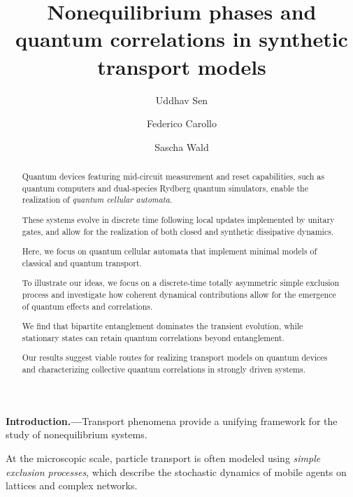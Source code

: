 \documentclass[aps,prl,twocolumn,groupedaddress,superscriptaddress,colorlinks,bookmarks=false,citecolor=darkspringgreen,linkcolor=darkolivegreen,urlcolor=navyblue]{revtex4-1}
\newcommand{\papertitle}{
Nonequilibrium phases and quantum correlations in
synthetic transport models
}
\begin{document}
\title{\papertitle}


\author{Uddhav Sen}


\author{Federico Carollo}


\author{Sascha Wald}




\begin{abstract}
    Quantum devices featuring mid-circuit measurement and reset capabilities, such as quantum computers and dual-species Rydberg quantum simulators, enable the realization of {\it quantum cellular automata}.

    These systems evolve in discrete time following local updates implemented by unitary gates, and allow for the realization of both closed and synthetic dissipative dynamics.

    Here, we focus on quantum cellular automata that implement minimal models of classical and quantum transport.

    To illustrate our ideas, we focus on a discrete-time totally asymmetric simple exclusion process and investigate how coherent dynamical contributions allow for the emergence of quantum effects and correlations.

    We find that bipartite entanglement dominates the transient evolution, while stationary states can retain quantum correlations beyond entanglement.

    Our results suggest viable routes for realizing transport models on quantum devices and characterizing collective quantum correlations in strongly driven systems.
\end{abstract}



\maketitle


{\bf Introduction.---}Transport phenomena provide a unifying framework for the study of nonequilibrium systems.

At the microscopic scale, particle transport is often modeled using {\it simple exclusion processes}, which describe the stochastic dynamics of mobile agents on lattices and complex networks.
\end{document}
